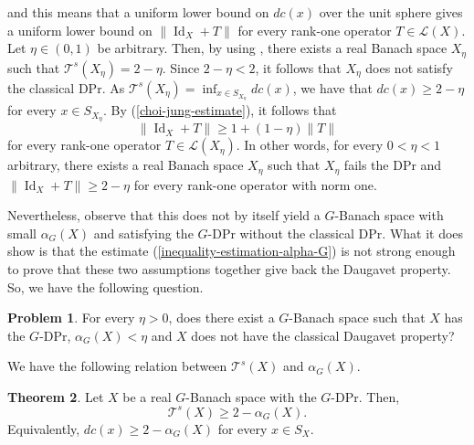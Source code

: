 \documentclass[a4paper,12pt]{amsart}
\theoremstyle{definition}
\newtheorem{theorem}{Theorem}[section]
\theoremstyle{definition}
\newtheorem{problem}[theorem]{Problem}
\theoremstyle{remark}
\numberwithin{equation}{section}
\DeclareMathOperator{\id}{Id}
\renewcommand{\geq}{\geqslant}
\newcommand{\<}{\langle}
\renewcommand{\>}{\rangle}
\begin{document}
	and this means that a uniform lower bound on $dc(x)$ over the unit sphere gives a uniform lower bound on $\| \id_X + T\|$ for every rank-one operator $T \in \mathcal{L}(X)$. Let $\eta \in (0,1)$ be arbitrary. Then, by using \cite[Theorem 2.7]{HallerLangemetsLimaNadelRuedaZoca2021}, there exists a real Banach space $X_{\eta}$ such that $\mathcal{T}^s(X_{\eta})=2 - \eta$. Since $2 - \eta < 2$, it follows that $X_{\eta}$ does not satisfy the classical DPr. As $\mathcal{T}^s(X_{\eta}) = \inf_{x \in S_{X_{\eta}}} dc(x)$, we have that $dc(x) \geq 2 - \eta$ for every $x \in S_{X_{\eta}}$. By (\ref{choi-jung-estimate}), it follows that 
	\begin{equation*}
		\| \id_X + T \| \geq 1 + (1-\eta) \|T\| 
	\end{equation*}
	for every rank-one operator $T \in \mathcal{L}(X_{\eta})$. In other words, for every $0 < \eta < 1$ arbitrary, there exists a real Banach space $X_{\eta}$ such that $X_{\eta}$ fails the DPr and $\| \id_X + T\| \geq 2 - \eta$ for every rank-one operator with norm one. 
	
	
	Nevertheless, observe that this does not by itself yield a $G$-Banach space with small $\alpha_G(X)$ and satisfying the $G$-DPr without the classical DPr. What it does show is that the estimate (\ref{inequality-estimation-alpha-G}) is not strong enough to prove that these two assumptions together give back the Daugavet property. So, we have the following question.
	\begin{problem} For every $\eta > 0$, does there exist a $G$-Banach space such that $X$ has the $G$-DPr, $\alpha_G(X) < \eta$ and $X$ does not have the classical Daugavet property?
	\end{problem}
	
	
	We have the following relation between $\mathcal{T}^s(X)$ and $\alpha_G(X)$.
	
	\begin{theorem} \label{estimate-T-s-alpha-G} Let $X$ be a real $G$-Banach space with the $G$-DPr. Then,
		\begin{equation*}
			\mathcal{T}^s(X) \geq 2 - \alpha_G(X).
		\end{equation*}
		Equivalently, $dc(x) \geq 2 - \alpha_G(X)$ for every $x \in S_X$.
	\end{theorem}
	
\end{document}
